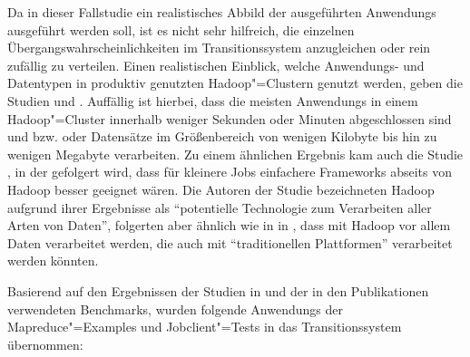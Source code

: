 Da in dieser Fallstudie ein realistisches Abbild der ausgeführten \glspl{Anwendung} ausgeführt werden soll, ist es nicht sehr hilfreich, die einzelnen Übergangswahrscheinlichkeiten im Transitionssystem anzugleichen oder rein zufällig zu verteilen.
Einen realistischen Einblick, welche Anwendungs- und Datentypen in produktiv genutzten Hadoop"=Clustern genutzt werden, geben \uA die Studien \cite{Chen2012} und \cite{HadoopDataTypes}.
Auffällig ist hierbei, dass die meisten \glspl{Anwendung} in einem Hadoop"=Cluster innerhalb weniger Sekunden oder Minuten abgeschlossen sind und bzw. oder Datensätze im Größenbereich von wenigen Kilobyte bis hin zu wenigen Megabyte verarbeiten.
Zu einem ähnlichen Ergebnis kam auch die Studie \cite{Ren2013}, in der gefolgert wird, dass für kleinere Jobs einfachere Frameworks abseits von Hadoop besser geeignet wären.
Die Autoren der Studie \cite{HadoopDataTypes} bezeichneten Hadoop aufgrund ihrer Ergebnisse als \enquote{potentielle Technologie zum Verarbeiten aller Arten von Daten}, folgerten aber ähnlich wie in \citeauthor{Ren2013} in \cite{Ren2013}, dass mit Hadoop vor allem Daten verarbeitet werden, die auch mit \enquote{traditionellen Plattformen} verarbeitet werden könnten.

Basierend auf den Ergebnissen der Studien in \cite{Huang2010,Chen2012,HadoopDataTypes,Ren2013} und der in den Publikationen \cite{Shvachko2010,Dean2004,Graves2013} verwendeten Benchmarks, wurden folgende \glspl{Anwendung} der Mapreduce"=Examples und Jobclient"=Tests in das Transitionssystem übernommen:

